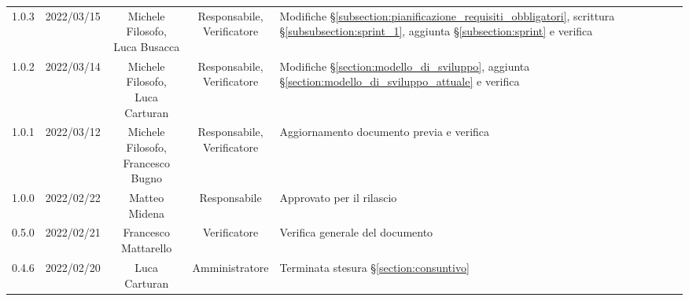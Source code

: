 \begin{center}
\begin{longtable}[c]{c | c | c | c | p{5cm}}
		1.0.3                                                      & 2022/03/15 & \Shortunderstack{Michele Filosofo,                                                                                                                                                                  \\Luca Busacca} & \Shortunderstack{Responsabile,\\Verificatore} & Modifiche §\ref{subsection:pianificazione_requisiti_obbligatori}, scrittura §\ref{subsubsection:sprint_1}, aggiunta §\ref{subsection:sprint} e verifica\\
		1.0.2                                                      & 2022/03/14 & \Shortunderstack{Michele Filosofo,                                                                                                                                                                  \\Luca Carturan} & \Shortunderstack{Responsabile,\\Verificatore} & Modifiche §\ref{section:modello_di_sviluppo}, aggiunta §\ref{section:modello_di_sviluppo_attuale} e verifica\\
		1.0.1                                                      & 2022/03/12 & \Shortunderstack{Michele Filosofo,                                                                                                                                                                  \\Francesco Bugno} & \Shortunderstack{Responsabile,\\Verificatore} & Aggiornamento documento previa \RTB{} e verifica\\
		1.0.0                                                      & 2022/02/22 & Matteo Midena                          & Responsabile   & Approvato per il rilascio                                                                                                                 \\
		0.5.0                                                      & 2022/02/21 & Francesco Mattarello                   & Verificatore   & Verifica generale del documento                                                                                                           \\
		0.4.6                                                      & 2022/02/20 & Luca Carturan                          & Amministratore & Terminata stesura §\ref{section:consuntivo}                                                                                               \\

\end{longtable}
\end{center}

